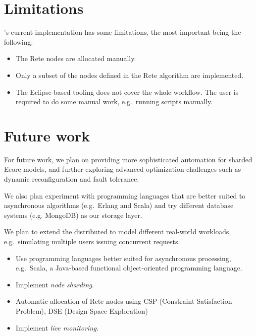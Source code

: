 \section{Limitations}

\iqd{}'s current implementation has some limitations, the most important being the following:

\begin{itemize}
  \item The Rete nodes are allocated manually.
  \item Only a subset of the nodes defined in the Rete algorithm are implemented. %
  \item The Eclipse-based tooling does not cover the whole workflow. The user is required to do some manual work, e.g.\ running scripts manually.
\end{itemize}

\section{Future work}
\label{future-work}

For future work, we plan on providing more sophisticated automation for sharded Ecore models, and further exploring advanced optimization challenges such as dynamic reconfiguration and fault tolerance.

We also plan experiment with programming languages that are better suited to asynchronous algorithms (e.g.\ Erlang and Scala) and try different database systems (e.g. MongoDB) as our storage layer.

We plan to extend the distributed \tb{} to model different real-world workloads, e.g.\ simulating multiple users issuing concurrent requests.

\begin{itemize}
  \item Use programming languages better suited for asynchronous processing, e.g.\ Scala, a Java-based functional object-oriented programming language.
  \item Implement \emph{node sharding}.
  \item Automatic allocation of Rete nodes using CSP (Constraint Satisfaction Problem), DSE (Design Space Exploration) \cite{DSE11}
  \item Implement \emph{live monitoring}. 
\end{itemize}
